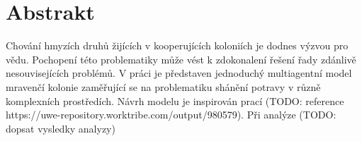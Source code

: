 \chapter*{Abstrakt}

Chování hmyzích druhů žijících v kooperujících koloniích je dodnes 
výzvou pro vědu. Pochopení této problematiky může vést k zdokonalení řešení
řady zdánlivě nesouvisejících problémů. V práci je představen jednoduchý
multiagentní model mravenčí kolonie zaměřující se na problematiku shánění
potravy v různě komplexních prostředích. Návrh modelu je inspirován prací 
(TODO: reference https://uwe-repository.worktribe.com/output/980579). 
Při analýze (TODO: dopsat vysledky analyzy)